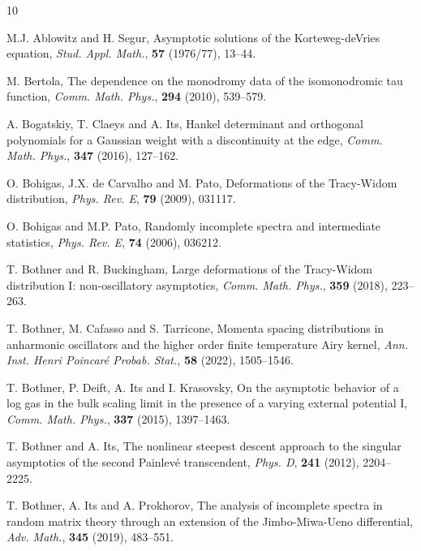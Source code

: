 \documentclass[11pt,a4paper]{article}
\numberwithin{equation}{section}
\begin{document}
\begin{thebibliography}{10}

M.J. Ablowitz and H. Segur, Asymptotic solutions of the Korteweg-deVries equation,
{\it Stud. Appl. Math.}, {\bf 57} (1976/77), 13--44.


M. Bertola, The dependence on the monodromy data of the isomonodromic tau function, {\it Comm. Math. Phys.}, {\bf 294} (2010), 539--579.

A. Bogatskiy, T. Claeys and A. Its, Hankel determinant and orthogonal polynomials for a Gaussian weight with a discontinuity at the edge, {\it Comm. Math. Phys.}, {\bf 347} (2016), 127--162.

O. Bohigas, J.X. de Carvalho and M. Pato, Deformations of the Tracy-Widom distribution,
{\it Phys. Rev. E}, {\bf 79} (2009), 031117.

O. Bohigas and M.P. Pato, Randomly incomplete spectra and intermediate statistics,
{\it Phys. Rev. E}, {\bf 74} (2006), 036212.



T. Bothner and R. Buckingham, Large deformations of the Tracy-Widom distribution I: non-oscillatory asymptotics, {\it Comm. Math. Phys.}, {\bf 359} (2018), 223--263.

T. Bothner,  M.  Cafasso and S. Tarricone,  Momenta spacing distributions in anharmonic oscillators and the higher order finite temperature Airy kernel, {\it Ann. Inst. Henri Poincar\'e Probab. Stat.}, {\bf 58} (2022), 1505--1546.

T. Bothner, P. Deift, A. Its and I. Krasovsky, On the asymptotic behavior of a log gas in the bulk scaling limit in the presence of a varying external potential I, {\it Comm. Math. Phys.}, {\bf 337} (2015), 1397--1463.

T. Bothner and A. Its, The nonlinear steepest descent approach to the singular asymptotics of the second Painlev\'e transcendent, {\it Phys. D}, {\bf 241} (2012), 2204--2225.



T. Bothner, A. Its and A. Prokhorov, The analysis of incomplete spectra in random matrix theory through an extension of the Jimbo-Miwa-Ueno differential, {\it Adv. Math.}, {\bf 345} (2019), 483--551.


\end{thebibliography}
\end{document}
